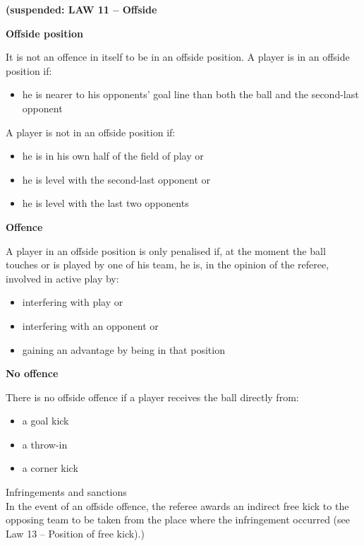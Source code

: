 \clearpage
\sffamily
{\color[rgb]{0.4,0.4,0.4}
\textbf{(suspended: LAW 11 -- Offside} }

\bigskip

{\color[rgb]{0.4,0.4,0.4}\textbf{Offside position}

\headlinebox

It is not an offence in itself to be in an offside position. A player is in an offside position if:

\begin{itemize}
\item he is nearer to his opponents{\textquoteright} goal line than both the ball and the second-last opponent
\end{itemize}

\bigskip

A player is not in an offside position if:

\begin{itemize}
\item he is in his own half of the field of play or
\item he is level with the second-last opponent or
\item he is level with the last two opponents
\end{itemize}
}

{\color[rgb]{0.4,0.4,0.4}\textbf{Offence}

\headlinebox

A player in an offside position is only penalised if, at the moment the ball touches or is played by one of his team, he is, in the opinion of the referee, involved in active play by:

\begin{itemize}
\item interfering with play or 
\item interfering with an opponent or 
\item gaining an advantage by being in that position
\end{itemize}
}

{\color[rgb]{0.4,0.4,0.4} \textbf{No offence}

\headlinebox

There is no offside offence if a player receives the ball directly from:

\begin{itemize}
\item a goal kick 
\item a throw-in 
\item a corner kick 
\end{itemize}
Infringements and sanctions \\
In the event of an offside offence, the referee awards an indirect free kick to the opposing team to be taken from the place where the infringement occurred (see Law 13 -- Position of free kick).) 

}